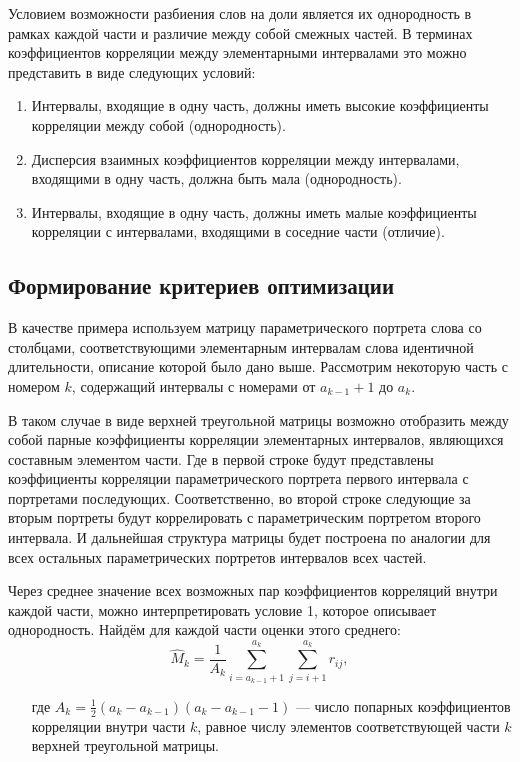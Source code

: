 Условием возможности разбиения слов на доли является их однородность в рамках каждой части и различие между собой смежных частей.
В терминах коэффициентов корреляции между элементарными интервалами это можно представить в виде следующих условий:
\begin{enumerate}[label={\arabic*)}]
	\item Интервалы, входящие в одну часть, должны иметь высокие коэффициенты корреляции между собой (однородность).
	\item Дисперсия взаимных коэффициентов корреляции между интервалами, входящими в одну часть, должна быть мала (однородность).
	\item Интервалы, входящие в одну часть, должны иметь малые коэффициенты корреляции с интервалами, входящими в соседние части (отличие).
\end{enumerate}


\subsection{Формирование критериев оптимизации} \label{sect2_2_2}

В качестве примера используем матрицу параметрического портрета слова со столбцами, соответствующими элементарным интервалам слова идентичной длительности, описание которой было дано выше.
Рассмотрим некоторую часть с номером $k$, содержащий интервалы с номерами от $a_{k-1} + 1$ до $a_k$.

В таком случае в виде верхней треугольной матрицы возможно отобразить между собой парные коэффициенты корреляции элементарных интервалов, являющихся составным элементом части.
Где в первой строке будут представлены коэффициенты корреляции параметрического портрета первого интервала с портретами последующих.
Соответственно, во второй строке следующие за вторым портреты будут коррелировать с параметрическим портретом второго интервала.
И дальнейшая структура матрицы будет построена по аналогии для всех остальных параметрических портретов интервалов всех частей.

Через среднее значение всех возможных пар коэффициентов корреляций внутри каждой части, можно интерпретировать условие 1, которое описывает однородность.
Найдём для каждой части оценки этого среднего:
\begin{equation}\label{eq:2_2_2_1}
\widehat{M}_k = \frac{1}{A_k} \sum^{a_k}_{i=a_{k-1}+1} \sum^{a_k}_{j=i+1} r_{ij},
\end{equation}
\begin{itemize}[align=left,leftmargin=1.8em,itemindent=0pt,labelsep=0pt,labelwidth=1.8em]
	\item[где] $A_k = \frac{1}{2} (a_k - a_{k-1})(a_k - a_{k-1} - 1)$ --- число попарных коэффициентов корреляции внутри части $k$, равное числу элементов соответствующей части $k$ верхней треугольной матрицы.
\end{itemize}

